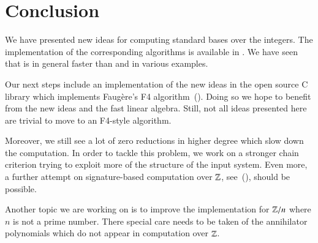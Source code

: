 \section{Conclusion}
We have presented new ideas for computing standard bases over the integers. The
implementation of the corresponding algorithms is available in \singular. We
have seen that \singular is in general faster than \macaulay and \magma in
various examples.

Our next steps include an implementation of the new ideas in the open source C library
\gbl which implements Faug\`ere's F4 algorithm~(\cite{gbl}). Doing so we hope to
benefit from the new ideas and the fast linear algebra. Still, not all ideas
presented here are trivial to move to an F4-style algorithm.

Moreover, we still see a lot of zero reductions in higher degree which slow down
the computation. In order to tackle this problem, we work on a stronger chain
criterion trying to exploit more of the structure of the input system. Even
more, a further attempt on signature-based computation over $\mathbb{Z}$,
see~(\cite{eppSigZ2017}), should be possible.

Another topic we are working on is to improve the implementation for $\mathbb{Z}/n$
where $n$ is not a prime number. There special care needs to be taken of the
annihilator polynomials which do not appear in computation over $\mathbb{Z}$.
